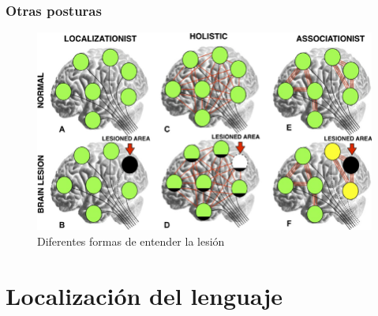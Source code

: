 \documentclass{beamer}
\begin{document}
		\begin{frame}
			\transfade
			\frametitle{Otras posturas}
\begin{figure}
\centering
\includegraphics[width=1\linewidth]{localizacionistas.png}
\caption{Diferentes formas de entender la lesión}
\label{fig:localizacionistas}
\end{figure}
		\end{frame}

\section{Localización del lenguaje}
\end{document}
